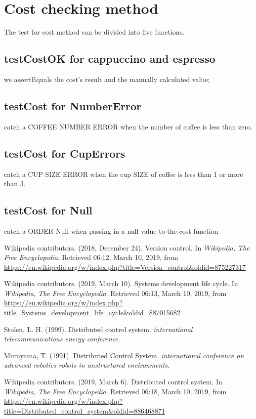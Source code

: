 \documentclass[a4paper]{report}
\begin{document}
\section{Cost checking method}
\par The test for cost method can be divided into five functions.

\subsection{testCostOK for cappuccino and espresso}
\par we assertEquals the cost's result and the manually calculated value;

\subsection{testCost for NumberError}
\par catch a COFFEE NUMBER ERROR when the number of coffee is less than zero.

\subsection{testCost for CupErrors}
\par catch a CUP SIZE ERROR when the cup SIZE of coffee is less than 1 or more than 3.

\subsection{testCost for Null}
\par catch a ORDER Null when passing in a null value to the cost function
\begin{thebibliography}{A}

Wikipedia contributors. (2018, December 24). Version control. In \emph{Wikipedia, The Free Encyclopedia}. Retrieved 06:12, March 10, 2019, from \url{https://en.wikipedia.org/w/index.php?title=Version_control&oldid=875227317}

Wikipedia contributors. (2019, March 10). Systems development life cycle. In \emph{Wikipedia, The Free Encyclopedia}. Retrieved 06:13, March 10, 2019, from \url{https://en.wikipedia.org/w/index.php?title=Systems_development_life_cycle&oldid=887015682}

Stolen, L. H. (1999). Distributed control system. \emph{international telecommunications energy conference.}

Murayama, T. (1991). Distributed Control System. \emph{international conference on advanced robotics robots in unstructured environments}.

Wikipedia contributors. (2019, March 6). Distributed control system. In \emph{Wikipedia, The Free Encyclopedia}. Retrieved 06:18, March 10, 2019, from \url{https://en.wikipedia.org/w/index.php?title=Distributed_control_system&oldid=886468871}

\end{thebibliography}
\end{document}
